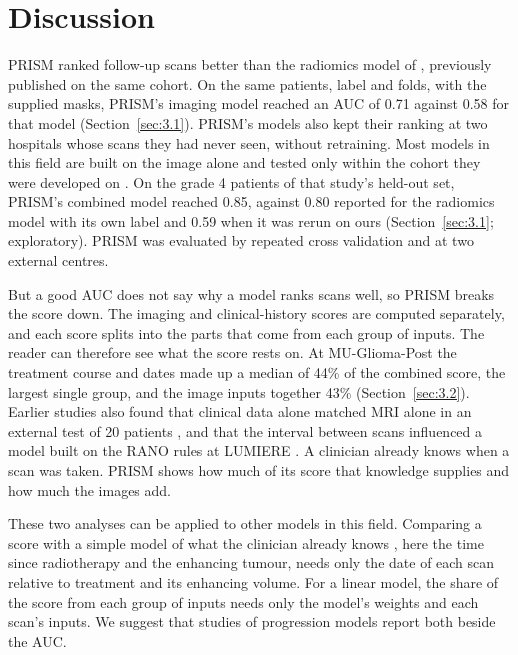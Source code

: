 \documentclass[largeformat]{interact} %
\begin{document}
\begin{table}[!htbp]
\end{table}

\section{Discussion}\label{sec:4}

PRISM ranked follow-up scans better than the radiomics model of \citet{christodoulou2026}, previously published
on the same cohort. On the same patients, label and folds, with the supplied masks, PRISM's imaging model reached an AUC of
0.71 against 0.58 for that model (Section~\ref{sec:3.1}). PRISM's models also
kept their ranking at two hospitals whose scans they had never seen, without retraining. Most models in this field are built on the image alone and tested only within the cohort they were developed on
\citep{booth2022}.
On the grade 4 patients of that study's held-out set, PRISM's combined model reached 0.85, against 0.80 reported for
the radiomics model with its own label and 0.59 when it was rerun on ours (Section~\ref{sec:3.1}; exploratory). PRISM was evaluated by repeated cross validation and at two external centres.

But a good AUC does not say why a model ranks scans well, so PRISM breaks the score down. The imaging and
clinical-history scores are computed separately, and each score splits into the parts that come from each group of
inputs. The reader can therefore see what the score rests on. At MU-Glioma-Post the treatment course and dates made up
a median of 44\% of the combined score, the largest single group, and the image inputs together 43\%
(Section~\ref{sec:3.2}). Earlier studies also found that clinical data alone matched MRI alone in an external test of 20 patients
\citep{gomaa2025}, and that the interval between scans influenced a model built on the RANO rules at LUMIERE
\citep{tarek2026}. A clinician
already knows when a scan was taken. PRISM shows how much of its score that knowledge supplies and how much the images
add.

These two analyses can be applied to other models in this field. Comparing a score with a simple model of what the
clinician already knows \citep{beaulieujones2021}, here the time since radiotherapy and the enhancing tumour, needs only
the date of each scan relative to treatment and its enhancing volume. For a linear model, the share of the score from
each group of inputs needs only the model's weights and each scan's inputs. We suggest that studies of progression models report both beside the AUC.
\end{document}
